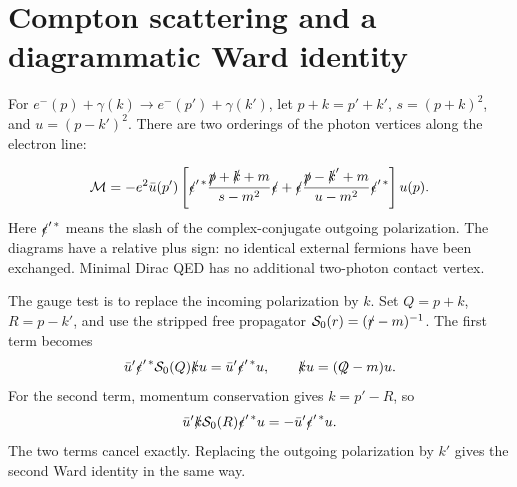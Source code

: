 \documentclass[11pt]{article}
\newcommand{\module}[1]{\clearpage\section{#1}}
\newcommand{\cM}{\mathcal M}
\begin{document}
\module{Compton scattering and a diagrammatic Ward identity}
For \(e^-(p)+\gamma(k)\to e^-(p')+\gamma(k')\), let
\(p+k=p'+k'\), \(s=(p+k)^2\), and \(u=(p-k')^2\).
There are two orderings of the photon vertices along the electron line:
\begin{center}
\end{center}
\begin{align}
 \cM=-e^2\bar u(p')\left[
 \slashed\epsilon'^{\,*}\frac{\slashed p+\slashed k+m}{s-m^2}
 \slashed\epsilon
 +\slashed\epsilon\frac{\slashed p-\slashed k'+m}{u-m^2}
 \slashed\epsilon'^{\,*}\right]u(p).
 \label{eq:compton}
\end{align}
Here \(\slashed\epsilon'^{\,*}\) means the slash of the complex-conjugate
outgoing polarization. The diagrams have a relative plus sign: no
identical external fermions have been exchanged. Minimal Dirac QED has
no additional two-photon contact vertex.

The gauge test is to replace the incoming polarization by \(k\).
Set \(Q=p+k\), \(R=p-k'\), and use the stripped free propagator
\(\mathcal S_0(r)=(\slashed r-m)^{-1}\). The first term becomes
\begin{equation}
 \bar u'\slashed\epsilon'^{\,*}\mathcal S_0(Q)\slashed k u
 =\bar u'\slashed\epsilon'^{\,*}u,
 \qquad \slashed k u=(\slashed Q-m)u.
\end{equation}
For the second term, momentum conservation gives \(k=p'-R\), so
\begin{equation}
 \bar u'\slashed k\mathcal S_0(R)\slashed\epsilon'^{\,*}u
 =-\bar u'\slashed\epsilon'^{\,*}u.
\end{equation}
The two terms cancel exactly. Replacing the outgoing polarization by
\(k'\) gives the second Ward identity in the same way.
\end{document}
